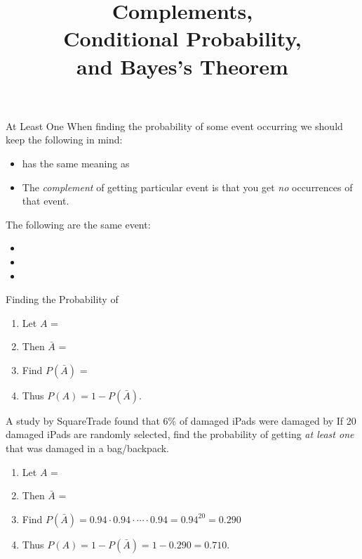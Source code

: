 \documentclass{beamer}
\title[MA205 - Section 4.3]{Complements,\\ Conditional Probability,\\ and Bayes's Theorem}
\newcommand{\prob}[1]{P\left(#1\right)}
\begin{document}
\begin{frame}
\titlepage
\end{frame}

\begin{frame}
\begin{block}{At Least One}
When finding the probability of some event occurring  we should keep the following in mind:
\begin{itemize}\pause
\item {} has the same meaning as \pause
\item The \emph{complement} of getting  particular event is that you get \emph{no} occurrences of that event.
\end{itemize}
\end{block}\pause

\begin{example}
The following are the same event:
\begin{itemize}
\item {}
\item {}
\item {}
\end{itemize}
\end{example}
\end{frame}

\begin{frame}
\begin{block}{Finding the Probability of }
\begin{enumerate}
\item Let $A$ = \pause
\item Then $\bar{A}$ = \pause
\item Find $\prob{\bar{A}}$ = \pause
\item Thus $\prob{A}=1-\prob{\bar{A}}$.
\end{enumerate}
\end{block}\pause

\begin{example}
A study by SquareTrade found that 6\% of damaged iPads were damaged by  If 20 damaged iPads are randomly selected, find the probability of getting \emph{at least one} that was damaged in a bag/backpack.\pause
\begin{enumerate}
\item Let $A$ = \pause
\item Then $\bar{A}$ = \pause
\item Find $\prob{\bar{A}}=0.94\cdot0.94\cdot\cdots\cdot0.94={0.94}^{20}=0.290$\pause
\item Thus $\prob{A}=1-\prob{\bar{A}}=1-0.290=0.710$.
\end{enumerate}
\end{example}
\end{frame}
\end{document}

